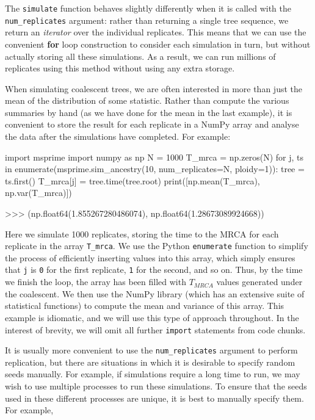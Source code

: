 \documentclass[graybox]{svmult}
\begin{document}
The
\texttt{simulate} function behaves slightly differently when it is
called with the \texttt{num\_replicates} argument: rather than returning
a single tree sequence, we return an \emph{iterator} over the individual
replicates. This means that we can use the
convenient \textbf{for} loop construction to consider each simulation in
turn, but without actually storing all these simulations. As a result,
we can run millions of replicates using this method without
using any extra storage.

When simulating coalescent trees, we are often interested in more than
just the mean of the distribution of some statistic. Rather than compute
the various summaries by hand (as we have done for the mean in the last
example), it is convenient to store the result for each
replicate in a NumPy array and analyse the data after the simulations have completed.
For example:

\begin{pythoncode}
import msprime
import numpy as np
N = 1000
T_mrca = np.zeros(N)
for j, ts in enumerate(msprime.sim_ancestry(10, num_replicates=N, ploidy=1)):
    tree = ts.first()
    T_mrca[j] = tree.time(tree.root)
print([np.mean(T_mrca), np.var(T_mrca)])

>>> (np.float64(1.855267280486074), np.float64(1.28673089924668))
\end{pythoncode}

    Here we simulate 1000 replicates, storing the time to the MRCA for each replicate in the array \texttt{T\_mrca}.  We use the Python \texttt{enumerate} function to simplify the process of efficiently inserting values into this
array, which simply ensures that \texttt{j} is \texttt{0} for the first replicate,
\texttt{1} for the second, and so on. Thus, by the time we finish the
loop, the array has been filled with $T_{MRCA}$ values generated
under the coalescent. We then use the NumPy library (which has
an extensive suite of statistical functions) to compute the mean and
variance of this array. This example is idiomatic, and we will use this
type of approach throughout. In the interest of brevity, we will omit all
further \texttt{import} statements from code chunks.

It is usually more convenient to use the \texttt{num\_replicates}
argument to perform replication, but there are situations in which it is
desirable to specify random seeds manually. For example, if simulations
require a long time to run, we may wish to use multiple processes to
run these simulations. To ensure that the seeds used in these different
processes are unique, it is best to manually specify them. For example,
\end{document}
